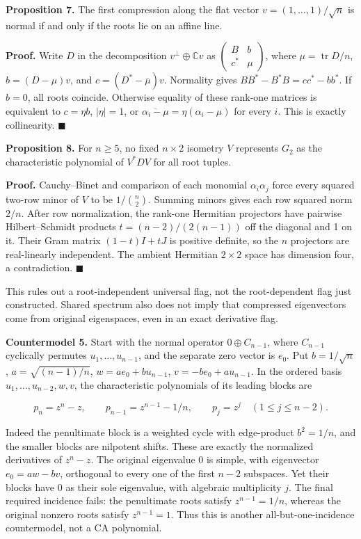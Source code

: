 \documentclass[
  british,
  10pt,
]{article}
\begin{document}
\textbf{Proposition 7.} The first compression along the flat vector
\(v=(1,\ldots,1)/\sqrt n\) is normal if and only if the roots lie on an
affine line.

\textbf{Proof.} Write \(D\) in the decomposition
\(v^\perp\oplus\mathbb Cv\) as
\(\begin{pmatrix}B&b\\c^*&\mu\end{pmatrix}\), where
\(\mu=\operatorname{tr}D/n\), \(b=(D-\mu)v\), and
\(c=(D^*-\overline\mu)v\). Normality gives \(BB^*-B^*B=cc^*-bb^*\). If
\(b=0\), all roots coincide. Otherwise equality of these rank-one
matrices is equivalent to \(c=\eta b\), \(|\eta|=1\), or
\(\overline{\alpha_i-\mu}=\eta(\alpha_i-\mu)\) for every \(i\). This is
exactly collinearity. \(\blacksquare\)

\textbf{Proposition 8.} For \(n\ge5\), no fixed \(n\times2\) isometry
\(V\) represents \(G_2\) as the characteristic polynomial of \(V^*DV\)
for all root tuples.

\textbf{Proof.} Cauchy--Binet and comparison of each monomial
\(\alpha_i\alpha_j\) force every squared two-row minor of \(V\) to be
\(1/\binom n2\). Summing minors gives each row squared norm \(2/n\).
After row normalization, the rank-one Hermitian projectors have pairwise
Hilbert--Schmidt products \(t=(n-2)/(2(n-1))\) off the diagonal and 1 on
it. Their Gram matrix \((1-t)I+tJ\) is positive definite, so the \(n\)
projectors are real-linearly independent. The ambient Hermitian
\(2\times2\) space has dimension four, a contradiction. \(\blacksquare\)

This rules out a root-independent universal flag, not the root-dependent
flag just constructed. Shared spectrum also does not imply that
compressed eigenvectors come from original eigenspaces, even in an exact
derivative flag.

\textbf{Countermodel 5.} Start with the normal operator
\(0\oplus C_{n-1}\), where \(C_{n-1}\) cyclically permutes
\(u_1,\ldots,u_{n-1}\), and the separate zero vector is \(e_0\). Put
\(b=1/\sqrt n\), \(a=\sqrt{(n-1)/n}\), \(w=ae_0+bu_{n-1}\),
\(v=-be_0+au_{n-1}\). In the ordered basis \(u_1,\ldots,u_{n-2},w,v\),
the characteristic polynomials of its leading blocks are

\[
 p_n=z^n-z,\qquad p_{n-1}=z^{n-1}-1/n,\qquad
 p_j=z^j\quad(1\le j\le n-2).                          \tag{9}
\]

Indeed the penultimate block is a weighted cycle with edge-product
\(b^2=1/n\), and the smaller blocks are nilpotent shifts. These are
exactly the normalized derivatives of \(z^n-z\). The original eigenvalue
0 is simple, with eigenvector \(e_0=aw-bv\), orthogonal to every one of
the first \(n-2\) subspaces. Yet their blocks have 0 as their sole
eigenvalue, with algebraic multiplicity \(j\). The final required
incidence fails: the penultimate roots satisfy \(z^{n-1}=1/n\), whereas
the original nonzero roots satisfy \(z^{n-1}=1\). Thus this is another
all-but-one-incidence countermodel, not a CA polynomial.
\end{document}
